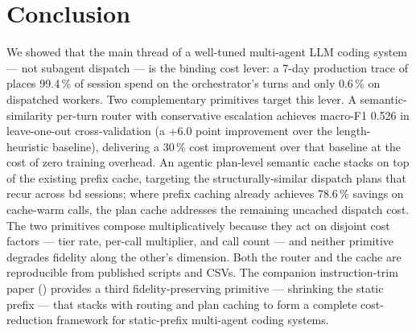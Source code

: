 \section{Conclusion}
\label{sec:conclusion}

We showed that the main thread of a well-tuned multi-agent LLM coding system --- not subagent dispatch --- is the binding cost lever: a 7-day production trace of \blackrim places 99.4\,\% of session spend on the orchestrator's turns and only 0.6\,\% on dispatched workers. Two complementary primitives target this lever. A semantic-similarity per-turn router with conservative escalation achieves macro-F1 0.526 in leave-one-out cross-validation (a +6.0 point improvement over the length-heuristic baseline), delivering a 30\,\% cost improvement over that baseline at the cost of zero training overhead. An agentic plan-level semantic cache stacks on top of the existing prefix cache, targeting the structurally-similar dispatch plans that recur across bd sessions; where prefix caching already achieves 78.6\,\% savings on cache-warm calls, the plan cache addresses the remaining uncached dispatch cost. The two primitives compose multiplicatively because they act on disjoint cost factors --- tier rate, per-call multiplier, and call count --- and neither primitive degrades fidelity along the other's dimension. Both the router and the cache are reproducible from published scripts and CSVs. The companion instruction-trim paper (\cite{trimpaper}) provides a third fidelity-preserving primitive --- shrinking the static prefix --- that stacks with routing and plan caching to form a complete cost-reduction framework for static-prefix multi-agent coding systems.
